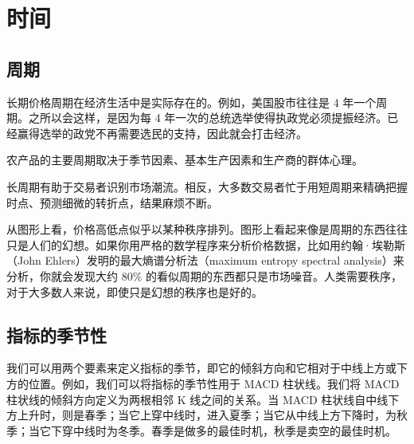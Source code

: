 \section{时间}
\subsection*{周期}
长期价格周期在经济生活中是实际存在的。例如，美国股市往往是 4 年一个周期。之所以会这样，是因为每 4 年一次的总统选举使得执政党必须提振经济。已经赢得选举的政党不再需要选民的支持，因此就会打击经济。

农产品的主要周期取决于季节因素、基本生产因素和生产商的群体心理。

长周期有助于交易者识别市场潮流。相反，大多数交易者忙于用短周期来精确把握时点、预测细微的转折点，结果麻烦不断。

从图形上看，价格高低点似乎以某种秩序排列。图形上看起来像是周期的东西往往只是人们的幻想。如果你用严格的数学程序来分析价格数据，比如用约翰·埃勒斯（John Ehlers）发明的最大熵谱分析法（maximum entropy spectral analysis）来分析，你就会发现大约 80\% 的看似周期的东西都只是市场噪音。人类需要秩序，对于大多数人来说，即使只是幻想的秩序也是好的。
\subsection*{指标的季节性}
我们可以用两个要素来定义指标的季节，即它的倾斜方向和它相对于中线上方或下方的位置。例如，我们可以将指标的季节性用于 MACD 柱状线。我们将 MACD 柱状线的倾斜方向定义为两根相邻 K 线之间的关系。当 MACD 柱状线自中线下方上升时，则是春季；当它上穿中线时，进入夏季；当它从中线上方下降时，为秋季；当它下穿中线时为冬季。春季是做多的最佳时机，秋季是卖空的最佳时机。